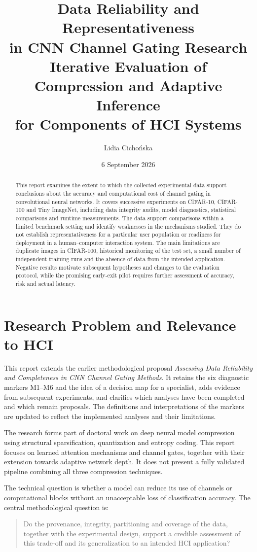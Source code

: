 \documentclass[12pt,a4paper]{article}
\title{Data Reliability and Representativeness\\
in CNN Channel Gating Research\\[0.5em]
\large Iterative Evaluation of Compression and Adaptive Inference\\
for Components of HCI Systems}
\author{Lidia Cichońska}
\date{6 September 2026}
\begin{document}
\maketitle

\begin{abstract}
This report examines the extent to which the collected experimental data
support conclusions about the accuracy and computational cost of channel
gating in convolutional neural networks. It covers successive experiments
on CIFAR-10, CIFAR-100 and Tiny ImageNet, including data integrity audits,
model diagnostics, statistical comparisons and runtime measurements.
The data support comparisons within a limited benchmark setting and
identify weaknesses in the mechanisms studied. They do not establish
representativeness for a particular user population or readiness for
deployment in a human--computer interaction system. The main limitations
are duplicate images in CIFAR-100, historical monitoring of the test set,
a small number of independent training runs and the absence of data from
the intended application. Negative results motivate subsequent hypotheses
and changes to the evaluation protocol, while the promising early-exit
pilot requires further assessment of accuracy, risk and actual latency.
\end{abstract}

\section{Research Problem and Relevance to HCI}

This report extends the earlier methodological proposal
\emph{Assessing Data Reliability and Completeness in CNN Channel Gating
Methods}.
It retains the six diagnostic markers M1--M6 and the idea of a decision
map for a specialist, adds evidence from subsequent experiments, and
clarifies which analyses have been completed and which remain proposals.
The definitions and interpretations of the markers are updated to reflect
the implemented analyses and their limitations.

The research forms part of doctoral work on deep neural model compression
using structural sparsification, quantization and entropy coding.
This report focuses on learned attention mechanisms and channel gates,
together with their extension towards adaptive network depth.
It does not present a fully validated pipeline combining all three
compression techniques.

The technical question is whether a model can reduce its use of channels
or computational blocks without an unacceptable loss of classification
accuracy. The central methodological question is:
\begin{quote}
Do the provenance, integrity, partitioning and coverage of the data,
together with the experimental design, support a credible assessment
of this trade-off and its generalization to an intended HCI application?
\end{quote}
\end{document}
